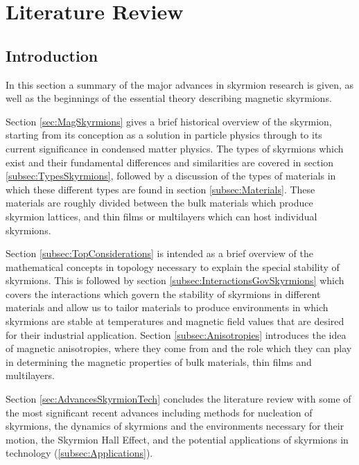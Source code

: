\chapter{Literature Review}\label{ch:LitRev}
\section{Introduction}\label{sec:LitRevIntro}
In this section a summary of the major advances in skyrmion research is given, as well as the beginnings of the essential theory describing magnetic skyrmions.

Section \ref{sec:MagSkyrmions} gives a brief historical overview of the skyrmion, starting from its conception as a solution in particle physics through to its current significance in condensed matter physics. The types of skyrmions which exist and their fundamental differences and similarities are covered in section \ref{subsec:TypesSkyrmions}, followed by a discussion of the types of materials in which these different types are found in section \ref{subsec:Materials}. These materials are roughly divided between the bulk materials which produce skyrmion lattices, and thin films or multilayers which can host individual skyrmions.

Section \ref{subsec:TopConsiderations} is intended as a brief overview of the mathematical concepts in topology necessary to explain the special stability of skyrmions. This is followed by section \ref{subsec:InteractionsGovSkyrmions} which covers the interactions which govern the stability of skyrmions in different materials and allow us to tailor materials to produce environments in which skyrmions are stable at temperatures and magnetic field values that are desired for their industrial application. 
Section \ref{subsec:Anisotropies} introduces the idea of magnetic anisotropies, where they come from and the role which they can play in determining the magnetic properties of bulk materials, thin films and multilayers.

Section \ref{sec:AdvancesSkyrmionTech} concludes the literature review with some of the most significant recent advances including methods for nucleation of skyrmions, the dynamics of skyrmions and the environments necessary for their motion, the Skyrmion Hall Effect, and the potential applications of skyrmions in technology (\ref{subsec:Applications}).


